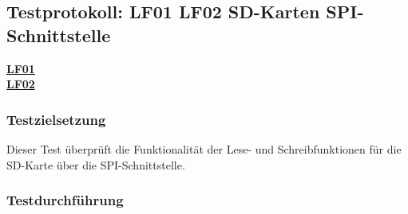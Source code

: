 \subsection{Testprotokoll: LF01 LF02 SD-Karten SPI-Schnittstelle}
\textbf{\hyperlink{LF01_Link}{LF01}} \\
\textbf{\hyperlink{LF02_Link}{LF02}} \\
\subsubsection{Testzielsetzung}
Dieser Test überprüft die Funktionalität der Lese- und Schreibfunktionen für die SD-Karte über die SPI-Schnittstelle.

\subsubsection{Testdurchführung}

